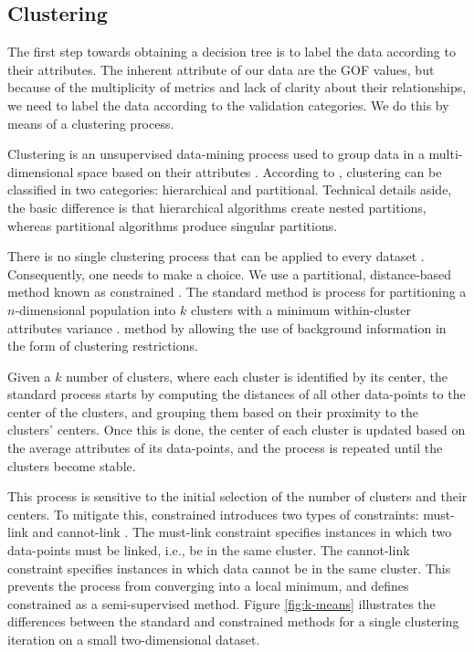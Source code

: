 
\subsection{Clustering}
\label{sec:clustering}

The first step towards obtaining a decision tree is to label the data according to their attributes. The inherent attribute of our data are the GOF values, but because of the multiplicity of metrics and lack of clarity about their relationships, we need to label the data according to the validation categories. We do this by means of a clustering process. 

Clustering is an unsupervised data-mining process used to group data in a multi-dimensional space based on their attributes \citep{Fayyad_1996_IEEE}. According to \citet{Jain_1999_ACMCS}, clustering can be classified in two categories: hierarchical and partitional. Technical details aside, the basic difference is that hierarchical algorithms create nested partitions, whereas partitional algorithms produce singular partitions. 

There is no single clustering process that can be applied to every dataset \citep{Dy_2004_MLR, Jain_1988_Book, Hartigan_1985_JOC}. Consequently, one needs to make a choice. We use a partitional, distance-based method known as constrained \kmeans{}. The standard \kmeans{} method is  process for partitioning a $n$-dimensional population into $k$ clusters with a minimum within-cluster attributes variance \citep[e.g.,][]{Macqueen_1967_Proc}.  method by allowing the use of background information in the form of clustering restrictions.

Given a $k$ number of clusters, where each cluster is identified by its center, the standard process starts by computing the distances of all other data-points to the center of the clusters, and grouping them based on their proximity to the clusters' centers. Once this is done, the center of each cluster is updated based on the average attributes of its data-points, and the process is repeated until the clusters become stable.

This process is sensitive to the initial selection of the number of clusters and their centers. To mitigate this, constrained \kmeans{} introduces two types of constraints: must-link and cannot-link \citep{Wagstaff_2001_Proc}. The must-link constraint specifies instances in which two data-points must be linked, i.e., be in the same cluster. The cannot-link constraint specifies instances in which data cannot be in the same cluster. This prevents the process from converging into a local minimum, and defines constrained \kmeans{} as a semi-supervised method. Figure \ref{fig:k-means} illustrates the differences between the standard and constrained \kmeans{} methods for a single clustering iteration on a small two-dimensional dataset.

